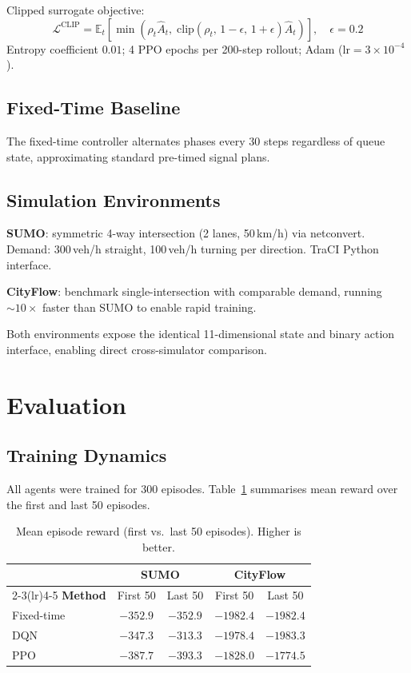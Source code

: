 \documentclass[10pt]{article}
\begin{document}
Clipped surrogate objective:
\begin{equation}
\mathcal{L}^{\text{CLIP}} =
\mathbb{E}_t\!\left[\min\!\left(
  \rho_t\hat{A}_t,\;
  \text{clip}(\rho_t,\,1{-}\epsilon,\,1{+}\epsilon)\hat{A}_t
\right)\right], \quad \epsilon=0.2
\end{equation}
Entropy coefficient $0.01$; 4 PPO epochs per 200-step rollout;
Adam ($\text{lr}=3\times10^{-4}$).

\subsection{Fixed-Time Baseline}

The fixed-time controller alternates phases every 30 steps regardless of queue
state, approximating standard pre-timed signal plans.

\subsection{Simulation Environments}

\textbf{SUMO}: symmetric 4-way intersection (2 lanes, 50\,km/h) via netconvert.
Demand: 300\,veh/h straight, 100\,veh/h turning per direction.  TraCI Python
interface.

\textbf{CityFlow}: benchmark single-intersection with comparable demand, running
${\sim}10{\times}$ faster than SUMO to enable rapid training.

Both environments expose the identical 11-dimensional state and binary action
interface, enabling direct cross-simulator comparison.

\section{Evaluation}

\subsection{Training Dynamics}

All agents were trained for 300 episodes.  Table~\ref{tab:training} summarises
mean reward over the first and last 50 episodes.

\begin{table}[htbp]
\centering
\caption{Mean episode reward (first vs.\ last 50 episodes). Higher is better.}
\label{tab:training}
\begin{tabular}{lcccc}
\toprule
 & \multicolumn{2}{c}{\textbf{SUMO}} & \multicolumn{2}{c}{\textbf{CityFlow}} \\
\cmidrule(lr){2-3}\cmidrule(lr){4-5}
\textbf{Method} & First 50 & Last 50 & First 50 & Last 50 \\
\midrule
Fixed-time & $-352.9$ & $-352.9$ & $-1982.4$ & $-1982.4$ \\
DQN        & $-347.3$ & $\mathbf{-313.3}$ & $-1978.4$ & $-1983.3$ \\
PPO        & $-387.7$ & $-393.3$ & $-1828.0$ & $\mathbf{-1774.5}$ \\
\bottomrule
\end{tabular}
\end{table}
\end{document}
